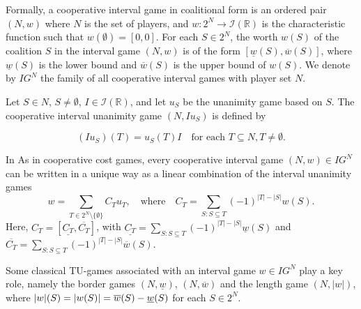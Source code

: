 \documentclass[12pt]{article}
\begin{document}
\noindent Formally, a cooperative interval game in coalitional form is an ordered pair 
$(N,w)$ where $N$ is the set of players, and $%
w:2^{N}\rightarrow \mathcal{I}(\mathbb{R})$ is the characteristic function
such that $w(\emptyset )=[0,0]$. For each $S\in 2^{N}$, the worth $w(S)$ of
the coalition $S$ in the interval game $(N,w)$ is of the form $[\underline{w}%
(S),\overline{w}(S)]$, where $\underline{w}(S)$ is the lower bound and $%
\overline{w}(S)$ is the upper bound of $w(S)$. We denote by $IG^{N}$ the
family of all cooperative interval games with player set $N$.

\noindent Let $S\in N$, $S \neq \emptyset$, $I\in \mathcal{I}(\mathbb{R})$, and let $u_{S}$ be the unanimity game based on $S$. The
cooperative interval unanimity game $(N,Iu_{S})$ is defined by  

\begin{equation*}
(Iu_{S})(T)=u_{S}(T)I\quad \text{for each } T \subseteq N, T \neq \emptyset.
\end{equation*}

\noindent In As in cooperative cost games, every cooperative interval game $(N,w)\in IG^{N}$
can be written in a unique way as a linear combination of the interval unanimity games 
\begin{equation*}
w=\sum_{T\in 2^{N}\setminus \{\emptyset \}}C_{T}u_{T},\quad \text{where}%
\quad C_{T}=\sum_{S:S\subseteq T}(-1)^{|T|-|S|}w(S).
\end{equation*}%
Here, $C_{T}=[\underline{C_{T}},\overline{C_{T}}]$, with $\underline{C_{T}}%
=\sum_{S:S\subseteq T}(-1)^{|T|-|S|}\underline{w}(S)$ and $\overline{C_{T}}%
=\sum_{S:S\subseteq T}(-1)^{|T|-|S|}\overline{w}(S)$. 



\noindent Some classical TU-games associated with an interval game $w\in
IG^{N}$ play a key role, namely the border games $(N,\underline{w})$, $(N,%
\overline{w})$ and the length game $(N,|w|)$, where $|w|(S)=|w(S)|=\overline{%
w}(S)-\underline{w}(S)$ for each $S\in 2^{N}$.
\end{document}
